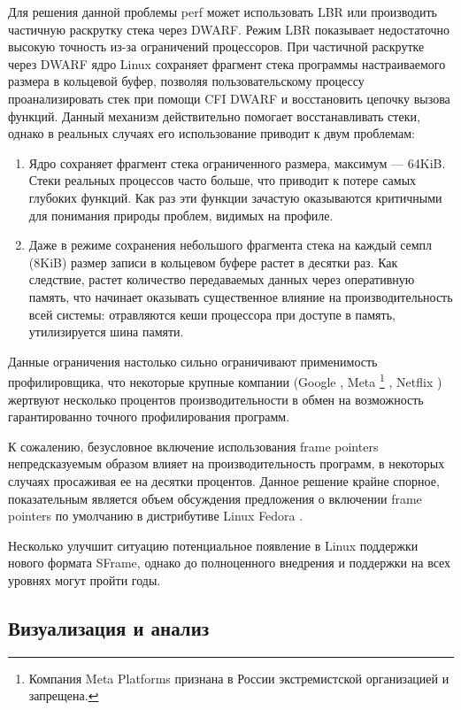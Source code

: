 Для решения данной проблемы perf может использовать LBR или производить частичную раскрутку стека через DWARF.
Режим LBR показывает недостаточно высокую точность из-за ограничений процессоров.
При частичной раскрутке через DWARF ядро Linux сохраняет фрагмент стека программы настраиваемого размера в кольцевой буфер,
позволяя пользовательскому процессу проанализировать стек при помощи CFI DWARF и восстановить цепочку вызова функций.
Данный механизм действительно помогает восстанавливать стеки, однако в реальных случаях его использование приводит к двум проблемам:
\begin{enumerate}
    \item
        Ядро сохраняет фрагмент стека ограниченного размера, максимум --- 64KiB.
        Стеки реальных процессов часто больше, что приводит к потере самых глубоких функций.
        Как раз эти функции зачастую оказываются критичными для понимания природы проблем, видимых на профиле.
    \item
        Даже в режиме сохранения небольшого фрагмента стека на каждый семпл (8KiB) размер записи в кольцевом буфере растет в десятки раз.
        Как следствие, растет количество передаваемых данных через оперативную память, что начинает оказывать существенное влияние на
        производительность всей системы: отравляются кеши процессора при доступе в память, утилизируется шина памяти.
\end{enumerate}

Данные ограничения настолько сильно ограничивают применимость профилировщика, что некоторые крупные компании
(Google \cite{fp:google}, Meta \footnote{Компания Meta Platforms признана в России экстремистской организацией и запрещена.}
\cite{fp:meta}, Netflix \cite{fp:netflix})
жертвуют несколько процентов производительности в обмен на возможность гарантированно точного профилирования программ.

К сожалению, безусловное включение использования frame pointers непредсказуемым образом влияет на производительность программ,
в некоторых случаях просаживая ее на десятки процентов. Данное решение крайне спорное, показательным является объем обсуждения
предложения о включении frame pointers по умолчанию в дистрибутиве Linux Fedora \cite{fp:fedora}.

Несколько улучшит ситуацию потенциальное появление в Linux поддержки нового формата SFrame, однако до полноценного внедрения и поддержки
на всех уровнях могут пройти годы.

\subsection{Визуализация и анализ}

